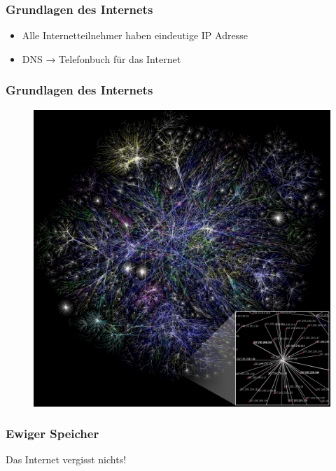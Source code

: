 \documentclass[12pt]{beamer}
\begin{document}
\begin{frame}
	\frametitle{Grundlagen des Internets}
	\begin{center}
		\begin{itemize}
			\item<1-> Alle Internetteilnehmer haben eindeutige IP Adresse
			\item<2-> DNS → Telefonbuch für das Internet
		\end{itemize}
	\end{center}
\end{frame}

\begin{frame}
  \frametitle{Grundlagen des Internets}
  \begin{figure}
    \includegraphics[height=0.85\textheight]{img/internet_map.jpg}
  \end{figure}
\end{frame}

\begin{frame}
  \frametitle{Ewiger Speicher}
  \begin{center} \Large
   Das Internet vergisst nichts!\\
  \end{center}
\end{frame}
\end{document}
